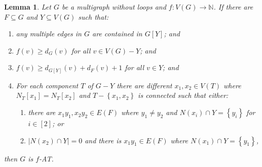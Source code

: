 \documentclass[12pt]{article}
\theoremstyle{plain}
\newtheorem{lem}[thm]{Lemma}
\theoremstyle{definition}
\theoremstyle{remark}
\newcommand{\IN}{\mathbb{N}}
\newcommand{\set}[1]{\left\{ #1 \right\}}
\newcommand{\card}[1]{\left|#1\right|}
\newcommand{\func}[3]{#1\colon #2 \rightarrow #3}
\newcommand{\irange}[1]{\left[#1\right]}
\begin{document}
\begin{lem}\label{ConfigurationTypeTwoEuler}
Let $G$ be a multigraph without loops and $\func{f}{V(G)}{\IN}$. If there are $F \subseteq G$ and
$Y \subseteq V(G)$ such that:
\begin{enumerate}
\item any multiple edges in $G$ are contained in $G[Y]$; and
\item $f(v) \geq d_G(v)$ for all $v \in V(G) - Y$; and
\item $f(v) \geq d_{G[Y]}(v) + d_F(v) + 1$ for all $v \in Y$; and
\item For each component $T$ of $G-Y$ there are different $x_1, x_2 \in V(T)$ where $N_T[x_1] = N_T[x_2]$ and $T - \set{x_1, x_2}$ is connected such that either:
	\begin{enumerate}
	\item there are $x_1y_1, x_2y_2 \in E(F)$ where $y_1 \neq y_2$ and $N(x_i) \cap Y = \set{y_i}$ for $i \in \irange{2}$; or
	\item $\card{N(x_2) \cap Y} = 0$ and there is $x_1y_1 \in E(F)$ where $N(x_1) \cap Y = \set{y_1}$,
	\end{enumerate}
\end{enumerate}

\noindent then $G$ is $f$-AT.
\end{lem}
\end{document}
